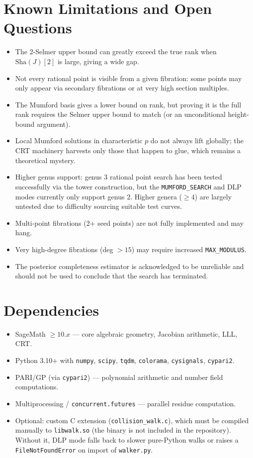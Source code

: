 \documentclass[11pt, a4paper]{article}
\begin{document}
\section{Known Limitations and Open Questions}

\begin{itemize}[label={\textbullet}]
    \item The 2-Selmer upper bound can greatly exceed the true rank when $\text{Sha}(J)[2]$ is large, giving a wide gap.
    \item Not every rational point is visible from a given fibration: some points may only appear via secondary fibrations or at very high section multiples.
    \item The Mumford basis gives a lower bound on rank, but proving it is the full rank requires the Selmer upper bound to match (or an unconditional height-bound argument).
    \item Local Mumford solutions in characteristic $p$ do not always lift globally; the CRT machinery harvests only those that happen to glue, which remains a theoretical mystery.
    \item Higher genus support: genus 3 rational point search has been tested successfully via the tower construction, but the \texttt{MUMFORD\_SEARCH} and DLP modes currently only support genus 2. Higher genera ($\geq 4$) are largely untested due to difficulty sourcing suitable test curves.
    \item Multi-point fibrations (2+ seed points) are not fully implemented and may hang.
    \item Very high-degree fibrations (deg $> 15$) may require increased \texttt{MAX\_MODULUS}.
    \item The posterior completeness estimator is acknowledged to be unreliable and should not be used to conclude that the search has terminated.
\end{itemize}

\section{Dependencies}

\begin{itemize}[label={\textbullet}]
    \item SageMath $\geq 10.x$ --- core algebraic geometry, Jacobian arithmetic, LLL, CRT.
    \item Python 3.10+ with \texttt{numpy}, \texttt{scipy}, \texttt{tqdm}, \texttt{colorama}, \texttt{cysignals}, \texttt{cypari2}.
    \item PARI/GP (via \texttt{cypari2}) --- polynomial arithmetic and number field computations.
    \item Multiprocessing / \texttt{concurrent.futures} --- parallel residue computation.
    \item Optional: custom C extension (\texttt{collision\_walk.c}), which must be compiled manually to \texttt{libwalk.so} (the binary is not included in the repository). Without it, DLP mode falls back to slower pure-Python walks or raises a \texttt{FileNotFoundError} on import of \texttt{walker.py}.
\end{itemize}
\end{document}
